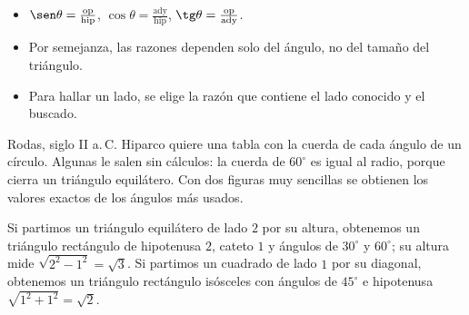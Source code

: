 \documentclass[11pt]{article}
\begin{document}
\begin{resumen}
\begin{itemize}
  \item $\sen\theta = \frac{\text{op}}{\text{hip}}$, $\cos\theta = \frac{\text{ady}}{\text{hip}}$,
        $\tg\theta = \frac{\text{op}}{\text{ady}}$.
  \item Por semejanza, las razones dependen solo del ángulo, no del tamaño del triángulo.
  \item Para hallar un lado, se elige la razón que contiene el lado conocido y el buscado.
\end{itemize}
\end{resumen}

\label{tema:angulosespeciales}

\begin{hilo}
Rodas, siglo II a.\,C. Hiparco quiere una tabla con la cuerda de cada ángulo
de un círculo. Algunas le salen sin cálculos: la cuerda de $60^\circ$ es igual
al radio, porque cierra un triángulo equilátero. Con dos figuras muy sencillas
se obtienen los valores exactos de los ángulos más usados.
\end{hilo}

Si partimos un triángulo equilátero de lado $2$ por su altura, obtenemos un
triángulo rectángulo de hipotenusa $2$, cateto $1$ y ángulos de $30^\circ$ y
$60^\circ$; su altura mide $\sqrt{2^2 - 1^2} = \sqrt{3}$. Si partimos un cuadrado
de lado $1$ por su diagonal, obtenemos un triángulo rectángulo isósceles con
ángulos de $45^\circ$ e hipotenusa $\sqrt{1^2 + 1^2} = \sqrt{2}$.

\begin{center}
\end{center}
\end{document}
